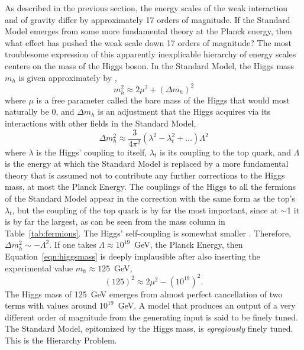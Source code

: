   As described in the previous section, the energy scales of the weak interaction and of gravity differ by approximately 17 orders of magnitude.
  If the Standard Model emerges from some more fundamental theory at the Planck energy, then what effect has pushed the weak scale down 17 orders of magnitude?
  The most troublesome expression of this apparently inexplicable hierarchy of energy scales centers on the mass of the Higgs boson.
  In the Standard Model, the Higgs mass $m_h$ is given approximately by \cite{SUSYnaturalness,higgsmass},
  \begin{equation} \label{eqn:higgsmass}
    m_h^2 \approx 2\mu^2 + (\Delta m_h)^2
  \end{equation}
  where $\mu$ is a free parameter called the bare mass of the Higgs that would most naturally be 0, and $\Delta m_h$ is an adjustment that the Higgs acquires via its interactions with other fields in the Standard Model,
  \begin{equation} \label{eqn:masscorrection}
    \Delta m_h^2 \approx \frac{3}{4\pi^2}\left(\lambda^2 - \lambda_t^2 + \ldots\right)\Lambda^2
  \end{equation}
  where $\lambda$ is the Higgs' coupling to itself, $\lambda_t$ is its coupling to the top quark, and $\Lambda$ is the energy at which the Standard Model is replaced by a more fundamental theory that is assumed not to contribute any further corrections to the Higgs mass, at most the Planck Energy.
  The couplings of the Higgs to all the fermions of the Standard Model appear in the correction with the same form as the top's $\lambda_t$, but the coupling of the top quark is by far the most important, since at $\sim$1 it is by far the largest, as can be seen from the mass column in Table~\ref{tab:fermions}.
  The Higgs' self-coupling is somewhat smaller \cite{higgsmass}.
  Therefore, $\Delta m_h^2 \sim -\Lambda^2$.
  If one takes $\Lambda \approx 10^{19}$~GeV, the Planck Energy, then Equation~\ref{eqn:higgsmass} is deeply implausible after also inserting the experimental value $m_h \approx 125$~GeV,
  \begin{equation}
    (125)^2 \approx 2\mu^2 - (10^{19})^2.
  \end{equation}
  The Higgs mass of 125~GeV emerges from almost perfect cancellation of two terms with values around $10^{19}$~GeV.
  A model that produces an output of a very different order of magnitude from the generating input is said to be finely tuned.
  The Standard Model, epitomized by the Higgs mass, is {\it egregiously} finely tuned.
  This is the Hierarchy Problem.

